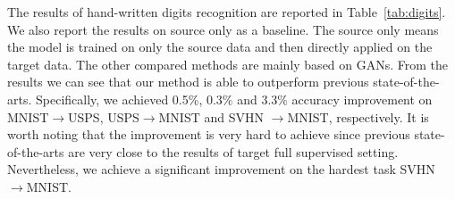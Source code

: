 \documentclass[sigconf]{acmart}
\begin{document}
\begin{table}[t!p]
\centering
\caption{Results (\%) of digits recognition. The best results are highlighted by bold numbers. The compared methods have the same experimental settings except for UNIT on SVHN $\rightarrow$MNIST which uses a larger training set. The results of the baselines are cited from corresponding papers.}
\vspace{-8pt}
\label{tab:digits}
\end{table}

The results of hand-written digits recognition are reported in Table~\ref{tab:digits}. We also report the results on source only as a baseline. The source only means the model is trained on only the source data and then directly applied on the target data. The other compared methods are mainly based on GANs. From the results we can see that our method is able to outperform previous state-of-the-arts. Specifically, we achieved 0.5\%, 0.3\% and 3.3\% accuracy improvement on MNIST$\rightarrow$USPS, USPS$\rightarrow$MNIST and SVHN $\rightarrow$MNIST, respectively. It is worth noting that the improvement is very hard to achieve since previous state-of-the-arts are very close to the results of target full supervised setting. Nevertheless, we achieve a significant improvement on the hardest task SVHN $\rightarrow$MNIST.
\end{document}

